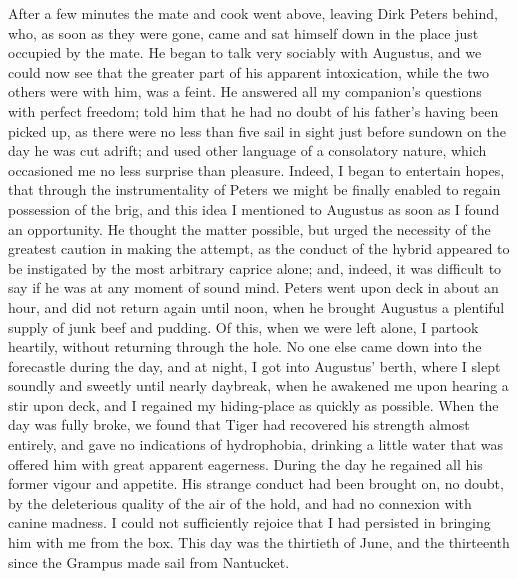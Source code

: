 After a few minutes the mate and cook went above, leaving Dirk Peters behind,
who, as soon as they were gone, came and sat himself down in the place just
occupied by the mate. He began to talk very sociably with Augustus, and we could
now see that the greater part of his apparent intoxication, while the two others
were with him, was a feint. He answered all my companion's questions with
perfect freedom; told him that he had no doubt of his father's having been
picked up, as there were no less than five sail in sight just before sundown on
the day he was cut adrift; and used other language of a consolatory nature,
which occasioned me no less surprise than pleasure. Indeed, I began to entertain
hopes, that through the instrumentality of Peters we might be finally enabled to
regain possession of the brig, and this idea I mentioned to Augustus as soon as
I found an opportunity. He thought the matter possible, but urged the necessity
of the greatest caution in making the attempt, as the conduct of the hybrid
appeared to be instigated by the most arbitrary caprice alone; and, indeed, it
was difficult to say if he was at any moment of sound mind. Peters went upon
deck in about an hour, and did not return again until noon, when he brought
Augustus a plentiful supply of junk beef and pudding. Of this, when we were left
alone, I partook heartily, without returning through the hole. No one else came
down into the forecastle during the day, and at night, I got into Augustus'
berth, where I slept soundly and sweetly until nearly daybreak, when he awakened
me upon hearing a stir upon deck, and I regained my hiding-place as quickly as
possible. When the day was fully broke, we found that Tiger had recovered his
strength almost entirely, and gave no indications of hydrophobia, drinking a
little water that was offered him with great apparent eagerness. During the day
he regained all his former vigour and appetite. His strange conduct had been
brought on, no doubt, by the deleterious quality of the air of the hold, and had
no connexion with canine madness. I could not sufficiently rejoice that I had
persisted in bringing him with me from the box. This day was the thirtieth of
June, and the thirteenth since the Grampus made sail from Nantucket. 

